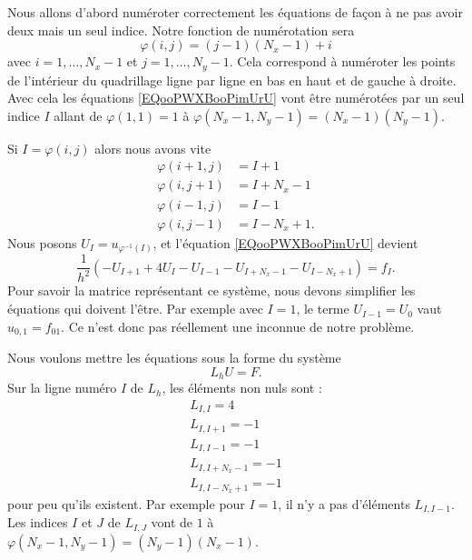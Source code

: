 Nous allons d'abord numéroter correctement les équations de façon à ne pas avoir deux mais un seul indice. Notre fonction de numérotation sera
\begin{equation}
	\varphi(i,j)=(j-1)(N_x-1)+i
\end{equation}
avec \( i=1,\ldots, N_x-1\) et \( j=1,\ldots, N_y-1\). Cela correspond à numéroter les points de l'intérieur du quadrillage ligne par ligne en bas en haut et de gauche à droite. Avec cela les équations \eqref{EQooPWXBooPimUrU} vont être numérotées par un seul indice \( I\) allant de \( \varphi(1,1)=1\) à \( \varphi(N_x-1,N_y-1)=(N_x-1)(N_y-1)\).

Si \( I=\varphi(i,j)\) alors nous avons vite
\begin{subequations}
	\begin{align}
		\varphi(i+1,j) & =I+1      \\
		\varphi(i,j+1) & =I+N_x-1  \\
		\varphi(i-1,j) & =I-1      \\
		\varphi(i,j-1) & =I-N_x+1.
	\end{align}
\end{subequations}
Nous posons \( U_I=u_{\varphi^{-1}(I)}\), et l'équation \eqref{EQooPWXBooPimUrU} devient
\begin{equation}
	\frac{1}{ h^2 }(-U_{I+1}+4U_I-U_{I-1}-U_{I+N_x-1}-U_{I-N_x+1})=f_I.
\end{equation}
Pour savoir la matrice représentant ce système, nous devons simplifier les équations qui doivent l'être. Par exemple avec \( I=1\), le terme \( U_{I-1}=U_0\) vaut \( u_{0,1}=f_01\). Ce n'est donc pas réellement une inconnue de notre problème.

Nous voulons mettre les équations sous la forme du système
\begin{equation}
	L_hU=F.
\end{equation}
Sur la ligne numéro \( I\) de \( L_h\), les éléments non nuls sont :
\begin{subequations}        \label{SUBEQQooSRQNooYrCNhj}
	\begin{align}
		L_{I,I}=4        \\
		L_{I,I+1}=-1     \\
		L_{I,I-1}=-1     \\
		L_{I,I+N_x-1}=-1 \\
		L_{I,I-N_x+1}=-1
	\end{align}
\end{subequations}
pour peu qu'ils existent. Par exemple pour \( I=1\), il n'y a pas d'éléments \( L_{I,I-1}\). Les indices \( I\) et \( J\) de \( L_{I,J}\) vont de \( 1\) à \( \varphi(N_x-1,N_y-1)=(N_y-1)(N_x-1)\).

